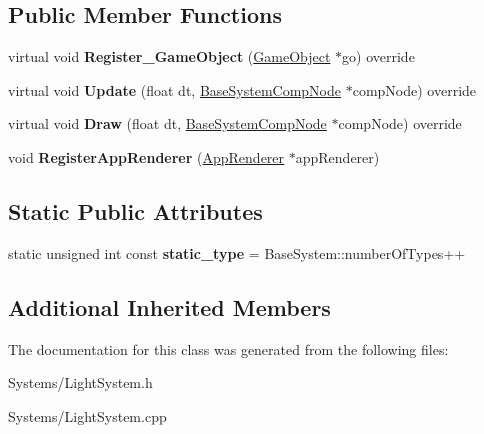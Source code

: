 \subsection*{Public Member Functions}
\begin{DoxyCompactItemize}
\item 
\mbox{\label{classLightSystem_a9f3eb997e5b2e8e4f18ca5095b6f2a61}} 
virtual void {\bfseries Register\+\_\+\+Game\+Object} (\hyperlink{classGameObject}{Game\+Object} $\ast$go) override
\item 
\mbox{\label{classLightSystem_a492572de092cdbaf76c3ca4d9806df94}} 
virtual void {\bfseries Update} (float dt, \hyperlink{structBaseSystemCompNode}{Base\+System\+Comp\+Node} $\ast$comp\+Node) override
\item 
\mbox{\label{classLightSystem_a56434d9d37cd418af1d4af672cde6ef4}} 
virtual void {\bfseries Draw} (float dt, \hyperlink{structBaseSystemCompNode}{Base\+System\+Comp\+Node} $\ast$comp\+Node) override
\item 
\mbox{\label{classLightSystem_a26dba0f68fe41206e7559ec1cab40aef}} 
void {\bfseries Register\+App\+Renderer} (\hyperlink{classAppRenderer}{App\+Renderer} $\ast$app\+Renderer)
\end{DoxyCompactItemize}
\subsection*{Static Public Attributes}
\begin{DoxyCompactItemize}
\item 
\mbox{\label{classLightSystem_a982aa4dde8bb5d8cea68a7d16357d49c}} 
static unsigned int const {\bfseries static\+\_\+type} = Base\+System\+::number\+Of\+Types++
\end{DoxyCompactItemize}
\subsection*{Additional Inherited Members}


The documentation for this class was generated from the following files\+:\begin{DoxyCompactItemize}
\item 
Systems/Light\+System.\+h\item 
Systems/Light\+System.\+cpp\end{DoxyCompactItemize}
